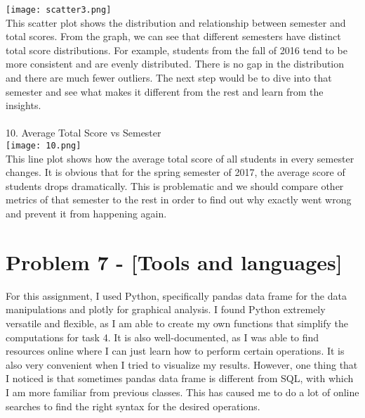 \documentclass[9pt,twoside]{exam}
\begin{document}
\texttt{[image: scatter3.png]}\\
This scatter plot shows the distribution and relationship between semester and total scores. From the graph, we can see that different semesters have distinct total score distributions. For example, students from the fall of 2016 tend to be more consistent and are evenly distributed. There is no gap in the distribution and there are much fewer outliers. The next step would be to dive into that semester and see what makes it different from the rest and learn from the insights. \\\\
10. Average Total Score vs Semester \\
\texttt{[image: 10.png]}\\
This line plot shows how the average total score of all students in every semester changes. It is obvious that for the spring semester of 2017, the average score of students drops dramatically. This is problematic and we should compare other metrics of that semester to the rest in order to find out why exactly went wrong and prevent it from happening again. 


\section*{Problem 7 -  [Tools and languages]}
For this assignment, I used Python, specifically pandas data frame for the data manipulations and plotly for graphical analysis. I found Python extremely versatile and flexible, as I am able to create my own functions that simplify the computations for task 4. It is also well-documented, as I was able to find resources online where I can just learn how to perform certain operations. It is also very convenient when I tried to visualize my results. However, one thing that I noticed is that sometimes pandas data frame is different from SQL, with which I am more familiar from previous classes. This has caused me to do a lot of online searches to find the right syntax for the desired operations. 
\end{document}
